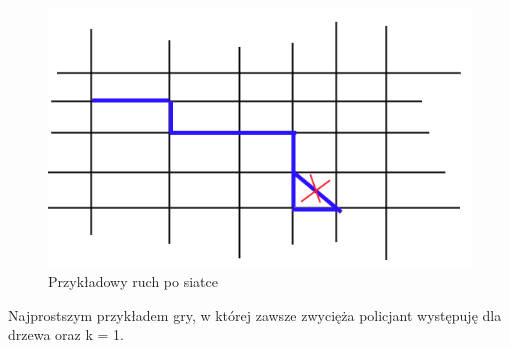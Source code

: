 \documentclass[brudnopis]{xmgr}
\newtheorem{Lemat}{Lemat}
\begin{document}
\begin{figure}[ht!]
  \centering
  \includegraphics{rysunki/przykladowy_ruch.png}
  \caption{Przykładowy ruch po siatce}
\end{figure} 
Najprostszym przykładem gry, w której zawsze zwycięża policjant występuję dla drzewa oraz k = 1.


\end{document}
